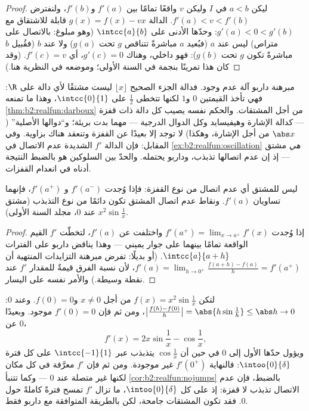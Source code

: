 \begin{proof}
ليكن $a < b$ في $I$ وليكن $v$ واقعًا تمامًا بين $f'(a)$ و$f'(b)$،
ولنفترض $f'(a) < v < f'(b)$. الدالة $g(x) = f(x) - vx$
قابلة للاشتقاق مع $g'(a) < 0 < g'(b)$: وحدّها الأدنى على
$\intcc{a}{b}$ (وهو مبلوغ: بالاتصال على متراص) ليس عند $a$
(فبُعيد $a$ مباشرةً تتناقص $g$ تحت $g(a)$) ولا عند $b$ (فقُبيل
$b$ مباشرةً تكون $g$ تحت $g(b)$): فهو داخلي، وهناك $g'(c)
= 0$، أي $f'(c) = v$. (وقد كان هذا تمرينًا بنجمة في السنة
الأولى؛ وموضعه في النظرية هنا.)
\end{proof}

\begin{example}\label{ex:b2:realfun:whichderivatives}
مبرهنة داربو آلة عدم وجود. فدالة الجزء الصحيح
$\lfloor x\rfloor$ ليست مشتقًا لأي دالة على
$\R$: فهي تأخذ القيمتين $0$ و$1$ لكنها تتخطى $\frac12$ على
$\intcc{0}{1}$، وهذا ما تمنعه \cref{thm:b2:realfun:darboux} من أجل
المشتقات. والحكم نفسه يصيب كل دالة ذات قفزة
--- كدالة الإشارة وهيفيسايد وكل الدوال الدرجية --- مهما بدت
بريئة؛ و``دوالها الأصلية'' ($\abs x$ من أجل الإشارة، وهكذا)
لا توجد إلا بعيدًا عن القفزة وتنعقد هناك بزاوية.
وفي المقابل: فإن الدالة $f'$ الشديدة عدم الاتصال في
\cref{ex:b2:realfun:oscillation} \emph{هي} مشتق --- إذ إن
عدم اتصالها تذبذب، وداربو يحتمله. والحدّ
بين السلوكين هو بالضبط النتيجة أدناه في انعدام القفزات.
\end{example}

\begin{corollary}\label{cor:b2:realfun:nojumps}
ليس للمشتق أي عدم اتصال من نوع القفزة: فإذا وُجدت $f'(a^-)$ و
$f'(a^+)$، فإنهما تساويان $f'(a)$. ونقاط عدم اتصال
المشتق تكون دائمًا من نوع التذبذب (مشتق $x^2\sin\frac1x$
عند $0$، مجلد السنة الأولى).
\end{corollary}

\begin{proof}
إذا وُجدت $f'(a^+) = \lim_{x\to a^+} f'(x)$ واختلفت عن
$f'(a)$، لتخطّت $f'$ القيم الواقعة تمامًا بينهما على
جوار يميني --- وهذا يناقض داربو على الفترات
$\intcc{a}{a + h}$. (أو بديلًا: تفرض مبرهنة التزايدات المنتهية
أن $f'(a) = \lim_{h\to0^+} \frac{f(a+h)-f(a)}{h} = f'(a^+)$،
لأن نسبة الفرق قيمةٌ للمقدار $f'$ عند نقطة وسيطة.)
والأمر نفسه على اليسار.
\end{proof}

\begin{example}\label{ex:b2:realfun:oscillation}
لتكن $f(x) = x^2\sin\frac1x$ من أجل $x \neq 0$ و$f(0) = 0$. وعند
$0$: $\bigl|\frac{f(h) - f(0)}{h}\bigr| = \abs{h\sin\frac1h}
\leq \abs h \to 0$، ومن ثم فإن $f'(0) = 0$ موجود. وبعيدًا عن $0$،
\[
f'(x) = 2x\sin\frac1x - \cos\frac1x ,
\]
ويؤول حدّها الأول إلى $0$ في حين أن $\cos\frac1x$ يتذبذب
عبر $\intcc{-1}{1}$ على كل فترة $\intoo{0}{\delta}$: فالنهاية
$f'(0^+)$ غير موجودة. ومن ثم فإن $f'$ معرَّفة في كل مكان لكنها
غير متصلة عند $0$ --- وكما تتنبأ
\cref{cor:b2:realfun:nojumps} بالضبط، فإن عدم الاتصال
تذبذب لا قفزة: إذ على كل $\intoo{0}{\delta}$، ما تزال $f'$
تمسح فترةً كاملةً حول $0$. فقد تكون المشتقات جامحة، لكن
بالطريقة المتوافقة مع داربو فقط.
\end{example}

